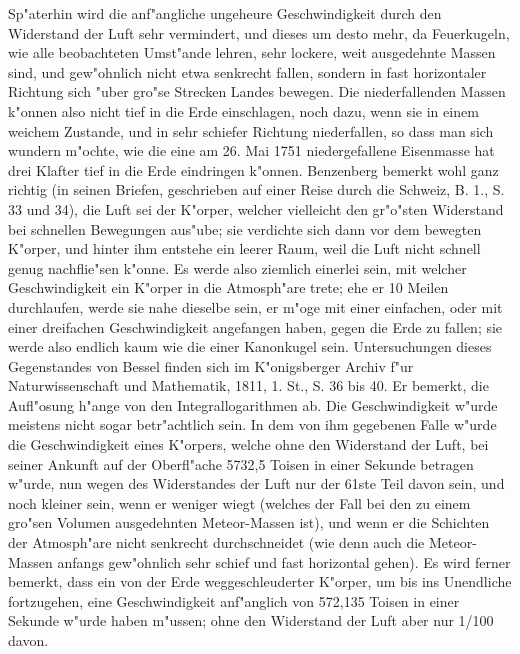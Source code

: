 \documentclass[a4paper, 11pt, oneside, polutonikogreek, german]{article}
\begin{document}
Sp"aterhin wird die anf"angliche ungeheure Geschwindigkeit durch den Widerstand der Luft sehr vermindert, und dieses um desto mehr, da Feuerkugeln, wie alle beobachteten Umst"ande lehren, sehr lockere, weit ausgedehnte Massen sind, und gew"ohnlich nicht etwa senkrecht fallen, sondern in fast horizontaler Richtung sich "uber gro"se Strecken Landes bewegen. Die niederfallenden Massen k"onnen also nicht tief in die Erde einschlagen, noch dazu, wenn sie in einem weichem Zustande, und in sehr schiefer Richtung niederfallen, so dass man sich wundern m"ochte, wie die eine am 26. Mai 1751 niedergefallene Eisenmasse hat drei Klafter tief in die Erde eindringen k"onnen. Benzenberg bemerkt wohl ganz richtig (in seinen Briefen, geschrieben auf einer Reise durch die Schweiz, B. 1., S. 33 und 34), die Luft sei der K"orper, welcher vielleicht den gr"o"sten Widerstand bei schnellen Bewegungen aus"ube; sie verdichte sich dann vor dem bewegten K"orper, und hinter ihm entstehe ein leerer Raum, weil die Luft nicht schnell genug nachflie"sen k"onne. Es werde also ziemlich einerlei sein, mit welcher Geschwindigkeit ein K"orper in die Atmosph"are trete; ehe er 10 Meilen durchlaufen, werde sie nahe dieselbe sein, er m"oge mit einer einfachen, oder mit einer dreifachen Geschwindigkeit angefangen haben, gegen die Erde zu fallen; sie werde also endlich kaum wie die einer Kanonkugel sein. Untersuchungen dieses Gegenstandes von Bessel finden sich im K"onigsberger Archiv f"ur Naturwissenschaft und Mathematik, 1811, 1. St., S. 36 bis 40. Er bemerkt, die Aufl"osung h"ange von den Integrallogarithmen ab. Die Geschwindigkeit w"urde meistens nicht sogar betr"achtlich sein. In dem von ihm gegebenen Falle w"urde die Geschwindigkeit eines K"orpers, welche ohne den Widerstand der Luft, bei seiner Ankunft auf der Oberfl"ache 5732,5 Toisen in einer Sekunde betragen w"urde, nun wegen des Widerstandes der Luft nur der 61ste Teil davon sein, und noch kleiner sein, wenn er weniger wiegt (welches der Fall bei den zu einem gro"sen Volumen ausgedehnten Meteor-Massen ist), und wenn er die Schichten der Atmosph"are nicht senkrecht durchschneidet (wie denn auch die Meteor-Massen anfangs gew"ohnlich sehr schief und fast horizontal gehen). Es wird ferner bemerkt, dass ein von der Erde weggeschleuderter K"orper, um bis ins Unendliche fortzugehen, eine Geschwindigkeit anf"anglich von 572,135 Toisen in einer Sekunde w"urde haben m"ussen; ohne den Widerstand der Luft aber nur 1/100 davon.
\end{document}
